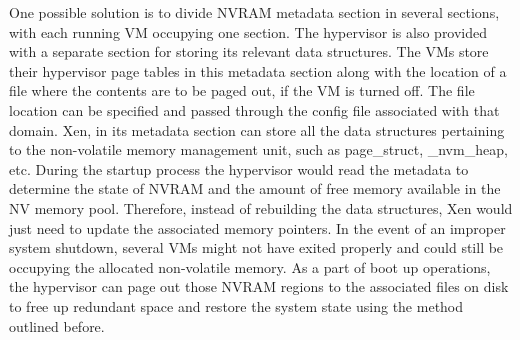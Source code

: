 One possible solution is to divide NVRAM metadata section in several sections, with each running VM occupying one section. The hypervisor is also provided with a separate section for storing its relevant data structures. The VMs store their hypervisor page tables in this metadata section along with the location of a file where the contents are to be paged out, if the VM is turned off. The file location can be specified and passed through the config file associated with that domain. Xen, in its metadata section can store all the data structures pertaining to the non-volatile memory management unit, such as page\_struct, \_nvm\_heap, etc. During the startup process the hypervisor would read the metadata to determine the state of NVRAM and the amount of free memory available in the NV memory pool. Therefore, instead of rebuilding the data structures, Xen would just need to update the associated memory pointers. In the event of an improper system shutdown, several VMs might not have exited properly and could still be occupying the allocated non-volatile memory. As a part of boot up operations, the hypervisor can page out those NVRAM regions to the associated files on disk to free up redundant space and restore the system state using the method outlined before. 
